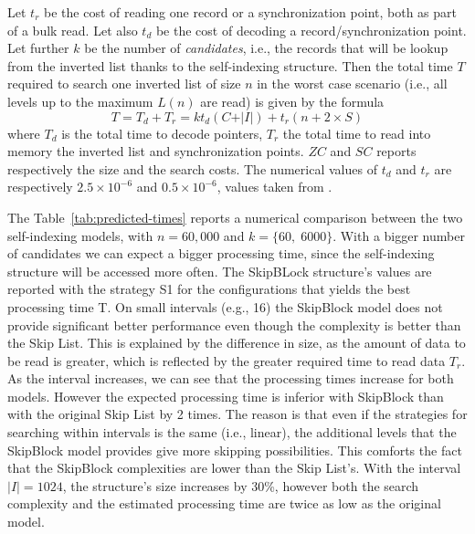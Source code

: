 Let $t_r$ be the cost of reading one record or a synchronization point, both as
part of a bulk read. Let also $t_d$ be the cost of decoding a
record/synchronization point. Let further $k$ be the number of
\emph{candidates}, i.e., the records that will be lookup from the inverted
list thanks to the self-indexing structure. Then the total time $T$ required
to search one inverted list of size $n$ in the worst case scenario (i.e., all
levels up to the maximum $L(n)$ are read) is given by the formula
\begin{displaymath}
T=T_d+T_r=kt_d\left( C + \vert I \vert \right)+t_r\left(n+2\times S\right) 
\end{displaymath}
where $T_d$ is the total time to decode pointers, $T_r$ the total time to read
into memory the inverted list and synchronization points. $ZC$ and $SC$ reports
respectively the size and the search costs. The numerical values of $t_d$ and
$t_r$ are respectively $2.5\times 10^{-6}$ and $0.5\times 10^{-6}$, values
taken from \cite{moffat:96}.

The Table~\ref{tab:predicted-times} reports a numerical comparison between the
two self-indexing models, with $n=60,000$ and $k=\{60,\;6000\}$. With a bigger
number of candidates we can expect a bigger processing time, since the
self-indexing structure will be accessed more often. The SkipBLock structure's
values are reported with the strategy S1 for the configurations that yields
the best processing time T. On small intervals (e.g., 16) the SkipBlock model
does not provide significant better performance even though the complexity is
better than the Skip List. This is explained by the difference in size, as the
amount of data to be read is greater, which is reflected by the greater
required time to read data $T_r$. As the interval increases, we can see that
the processing times increase for both models. However the expected
processing time is inferior with SkipBlock than with the original Skip List by
2 times.
The reason is that even if the strategies for searching within intervals is
the same (i.e., linear), the additional levels that the SkipBlock model
provides give more skipping possibilities. This comforts the fact that the
SkipBlock complexities are lower than the Skip List's. With the interval
$\vert I \vert = 1024$, the structure's size increases by 30\%, however both
the search complexity and the estimated processing time are twice as low as
the original model.

